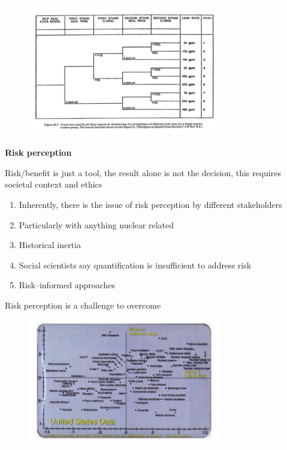 \documentclass[aspectratio=1610,pdftex,dvipsnames,compress,xcolor={dvipsnames}]{beamer}
\begin{document}
\begin{frame}{}
    \begin{figure}
        \centering
        \includegraphics[width=0.75\textwidth]{event.tree.gpm.jpg}
    \end{figure}
\end{frame}


\begin{frame}[plain]{}
    \centering\LARGE\textbf{Risk perception}
\end{frame}


\addtocounter{framenumber}{-1}
\begin{frame}{Risk/benefit is just a tool, the result alone is not the decision, this requires societal context and ethics}
    \begin{enumerate}[series=outerlist,topsep=0pt,itemsep=21pt,leftmargin=*,label=(\arabic*)]
        \item[]Inherently, there is the issue of risk perception by different stakeholders
        \item[]Particularly with anything nuclear related
        \item[]Historical inertia
        \item[]Social scientists say quantification is insufficient to address risk
        \item[]Risk--informed approaches
    \end{enumerate}
\end{frame}


\begin{frame}{Risk perception is a challenge to overcome}
    \begin{figure}
        \centering
        \includegraphics[width=0.75\textwidth]{risk.perception.jpg}
    \end{figure}
\end{frame}
\end{document}
